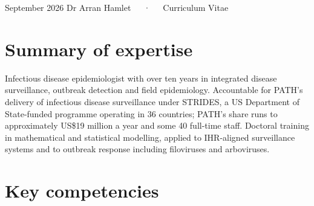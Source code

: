 \documentclass[11pt,a4paper,]{awesome-cv}
\begin{document}
\makecvheader

\makecvfooter
  {September 2026}
    {Dr Arran Hamlet~~~·~~~Curriculum Vitae}
  {\thepage}





\section{Summary of expertise}\label{summary-of-expertise}

Infectious disease epidemiologist with over ten years in integrated
disease surveillance, outbreak detection and field epidemiology.
Accountable for PATH's delivery of infectious disease surveillance under
STRIDES, a US Department of State-funded programme operating in 36
countries; PATH's share runs to approximately US\$19 million a year and
some 40 full-time staff. Doctoral training in mathematical and
statistical modelling, applied to IHR-aligned surveillance systems and
to outbreak response including filoviruses and arboviruses.

\section{Key competencies}\label{key-competencies}
\end{document}

